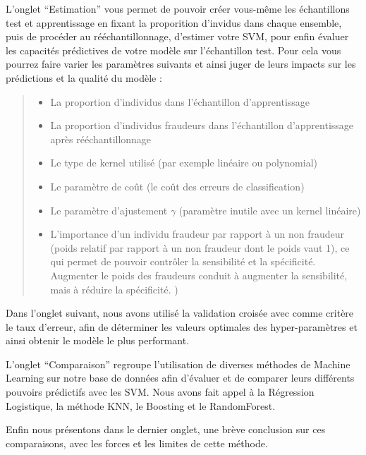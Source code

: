 \documentclass[]{article}
\providecommand{\tightlist}{%
  \setlength{\itemsep}{0pt}\setlength{\parskip}{0pt}}
\begin{document}
L'onglet ``Estimation'' vous permet de pouvoir créer vous-même les
échantillons test et apprentissage en fixant la proporition d'invidus
dans chaque ensemble, puis de procéder au rééchantillonnage, d'estimer
votre SVM, pour enfin évaluer les capacités prédictives de votre modèle
sur l'échantillon test. Pour cela vous pourrez faire varier les
paramètres suivants et ainsi juger de leurs impacts sur les prédictions
et la qualité du modèle :

\begin{quote}
\begin{itemize}
\tightlist
\item
  La proportion d'individus dans l'échantillon d'apprentissage
\item
  La proportion d'individus fraudeurs dans l'échantillon d'apprentissage
  après rééchantillonnage
\item
  Le type de kernel utilisé (par exemple linéaire ou polynomial)
\item
  Le paramètre de coût (le coût des erreurs de classification)
\item
  Le paramètre d'ajustement \(\gamma\) (paramètre inutile avec un kernel
  linéaire)
\item
  L'importance d'un individu fraudeur par rapport à un non fraudeur
  (poids relatif par rapport à un non fraudeur dont le poids vaut 1), ce
  qui permet de pouvoir contrôler la sensibilité et la spécificité.
  Augmenter le poids des fraudeurs conduit à augmenter la sensibilité,
  mais à réduire la spécificité. )
\end{itemize}
\end{quote}

Dans l'onglet suivant, nous avons utilisé la validation croisée avec
comme critère le taux d'erreur, afin de déterminer les valeurs optimales
des hyper-paramètres et ainsi obtenir le modèle le plus performant.

L'onglet ``Comparaison'' regroupe l'utilisation de diverses méthodes de
Machine Learning sur notre base de données afin d'évaluer et de comparer
leurs différents pouvoirs prédictifs avec les SVM. Nous avons fait appel
à la Régression Logistique, la méthode KNN, le Boosting et le
RandomForest.

Enfin nous présentons dans le dernier onglet, une brève conclusion sur
ces comparaisons, avec les forces et les limites de cette méthode.
\end{document}
